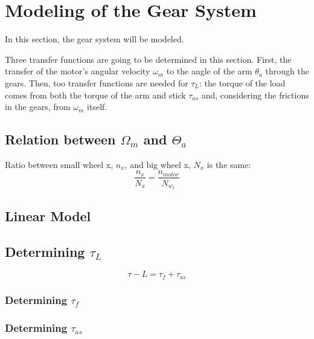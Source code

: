 \section{Modeling of the Gear System}
In this section, the gear system will be modeled. 



Three transfer functions are going to be determined in this section. First, the transfer of the motor's angular velocity $\omega_m$ to the angle of the arm $\theta_a$ through the gears. Then, too transfer functions are needed for $\tau_L$: the torque of the load comes from both the torque of the arm and stick $\tau_{as}$ and, considering the frictions in the gears, from $\omega_m$ itself.


\subsection{Relation between $\Omega_m$ and $\Theta_a$}
Ratio between small wheel x, $n_x$, and big wheel x, $N_x$ is the same:
\begin{equation}
	\frac{n_x}{N_x} = \frac{n_{motor}}{N_{w_1}}
\end{equation}

\subsection{Linear Model}

\subsection{Determining $\tau_L$}

\begin{equation}
	\tau-L = \tau_f + \tau_{as}
\end{equation}

\subsubsection*{Determining $\tau_{f}$}

\subsubsection*{Determining $\tau_{as}$}


